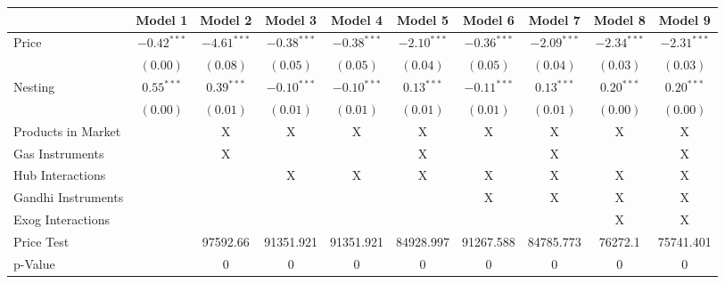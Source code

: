 
\begin{tabular}{l c c c c c c c c c}
\toprule
 & Model 1 & Model 2 & Model 3 & Model 4 & Model 5 & Model 6 & Model 7 & Model 8 & Model 9 \\
\midrule
Price                       & $-0.42^{***}$ & $-4.61^{***}$ & $-0.38^{***}$ & $-0.38^{***}$ & $-2.10^{***}$ & $-0.36^{***}$ & $-2.09^{***}$ & $-2.34^{***}$ & $-2.31^{***}$ \\
                            & $(0.00)$      & $(0.08)$      & $(0.05)$      & $(0.05)$      & $(0.04)$      & $(0.05)$      & $(0.04)$      & $(0.03)$      & $(0.03)$      \\
Nesting                     & $0.55^{***}$  & $0.39^{***}$  & $-0.10^{***}$ & $-0.10^{***}$ & $0.13^{***}$  & $-0.11^{***}$ & $0.13^{***}$  & $0.20^{***}$  & $0.20^{***}$  \\
                            & $(0.00)$      & $(0.01)$      & $(0.01)$      & $(0.01)$      & $(0.01)$      & $(0.01)$      & $(0.01)$      & $(0.00)$      & $(0.00)$      \\
\midrule
Products in Market          &               & X             & X             & X             & X             & X             & X             & X             & X             \\
Gas Instruments             &               & X             &               &               & X             &               & X             &               & X             \\
Hub Interactions            &               &               & X             & X             & X             & X             & X             & X             & X             \\
Gandhi Instruments          &               &               &               &               &               & X             & X             & X             & X             \\
Exog Interactions           &               &               &               &               &               &               &               & X             & X             \\
Price Test                  &               & 97592.66      & 91351.921     & 91351.921     & 84928.997     & 91267.588     & 84785.773     & 76272.1       & 75741.401     \\
p-Value                     &               & 0             & 0             & 0             & 0             & 0             & 0             & 0             & 0             \\

\end{tabular}
